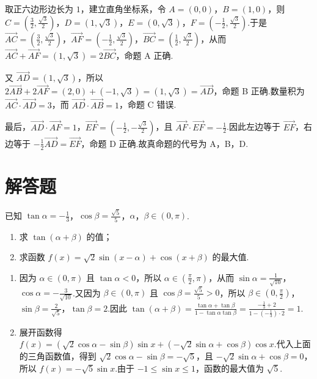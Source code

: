 \begin{solution}
取正六边形边长为 \(1\)，建立直角坐标系，令 \(A=(0,0)\)，\(B=(1,0)\)，则 \(C=(\frac32,\frac{\sqrt3}{2})\)，\(D=(1,\sqrt3)\)，\(E=(0,\sqrt3)\)，\(F=(-\frac12,\frac{\sqrt3}{2})\).于是
\(\overrightarrow{AC}=(\frac32,\frac{\sqrt3}{2})\)，\(\overrightarrow{AF}=(-\frac12,\frac{\sqrt3}{2})\)，\(\overrightarrow{BC}=(\frac12,\frac{\sqrt3}{2})\)，从而 \(\overrightarrow{AC}+\overrightarrow{AF}=(1,\sqrt3)=2\overrightarrow{BC}\)，命题 A 正确.

又 \(\overrightarrow{AD}=(1,\sqrt3)\)，所以 \(2\overrightarrow{AB}+2\overrightarrow{AF}=(2,0)+(-1,\sqrt3)=(1,\sqrt3)=\overrightarrow{AD}\)，命题 B 正确.数量积为 \(\overrightarrow{AC}\cdot\overrightarrow{AD}=3\)，而 \(\overrightarrow{AD}\cdot\overrightarrow{AB}=1\)，命题 C 错误.

最后，\(\overrightarrow{AD}\cdot\overrightarrow{AF}=1\)，\(\overrightarrow{EF}=(-\frac12,-\frac{\sqrt3}{2})\)，且 \(\overrightarrow{AF}\cdot\overrightarrow{EF}=-\frac12\).因此左边等于 \(\overrightarrow{EF}\)，右边等于 \(-\frac12\overrightarrow{AD}=\overrightarrow{EF}\)，命题 D 正确.故真命题的代号为 A，B，D.
\end{solution}

\section{解答题}

\begin{problem}
已知 \(\tan \alpha = -\frac{1}{3}\)，\(\cos \beta = \frac{\sqrt{5}}{5}\)，\(\alpha\)，\(\beta \in (0, \pi)\).
\begin{enumerate}
\item 求 \( \tan(\alpha + \beta) \) 的值；
\item 求函数 \( f(x)=\sqrt{2}\sin(x-\alpha)+\cos(x+\beta) \) 的最大值.
\end{enumerate}
\end{problem}

\begin{solution}
\begin{enumerate}
\item 因为 \(\alpha\in(0,\pi)\) 且 \(\tan\alpha<0\)，所以 \(\alpha\in(\frac\pi2,\pi)\)，从而 \(\sin\alpha=\frac1{\sqrt{10}}\)，\(\cos\alpha=-\frac3{\sqrt{10}}\).又因为 \(\beta\in(0,\pi)\) 且 \(\cos\beta=\frac{\sqrt5}{5}>0\)，所以 \(\beta\in(0,\frac\pi2)\)，\(\sin\beta=\frac2{\sqrt5}\)，\(\tan\beta=2\).因此
\(\tan(\alpha+\beta)=\frac{\tan\alpha+\tan\beta}{1-\tan\alpha\tan\beta}=\frac{-\frac13+2}{1-(-\frac13)\cdot2}=1\).
\item 展开函数得
\(f(x)=(\sqrt2\cos\alpha-\sin\beta)\sin x+(-\sqrt2\sin\alpha+\cos\beta)\cos x\).代入上面的三角函数值，得到 \(\sqrt2\cos\alpha-\sin\beta=-\sqrt5\)，且 \(-\sqrt2\sin\alpha+\cos\beta=0\)，所以 \(f(x)=-\sqrt5\sin x\).由于 \(-1\leqslant\sin x\leqslant1\)，函数的最大值为 \(\sqrt5\).
\end{enumerate}
\end{solution}

